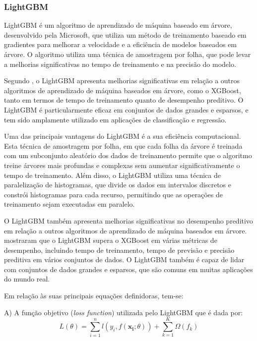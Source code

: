 \subsubsection{LightGBM}

LightGBM é um algoritmo de aprendizado de máquina baseado em árvore, desenvolvido pela Microsoft, que utiliza um método de treinamento baseado em gradientes para melhorar a velocidade e a eficiência de modelos baseados em árvore. O algoritmo utiliza uma técnica de amostragem por folha, que pode levar a melhorias significativas no tempo de treinamento e na precisão do modelo.

Segundo \cite{ke2017lightgbm}, o LightGBM apresenta melhorias significativas em relação a outros algoritmos de aprendizado de máquina baseados em árvore, como o XGBoost, tanto em termos de tempo de treinamento quanto de desempenho preditivo. O LightGBM é particularmente eficaz em conjuntos de dados grandes e esparsos, e tem sido amplamente utilizado em aplicações de classificação e regressão.

Uma das principais vantagens do LightGBM é a sua eficiência computacional. Esta técnica de amostragem por folha, em que cada folha da árvore é treinada com um subconjunto aleatório dos dados de treinamento permite que o algoritmo treine árvores mais profundas e complexas sem aumentar significativamente o tempo de treinamento. Além disso, o LightGBM utiliza uma técnica de paralelização de histogramas, que divide os dados em intervalos discretos e constrói histogramas para cada recurso, permitindo que as operações de treinamento sejam executadas em paralelo.

O LightGBM também apresenta melhorias significativas no desempenho preditivo em relação a outros algoritmos de aprendizado de máquina baseados em árvore. \cite{ke2017lightgbm} mostraram que o LightGBM supera o XGBoost em várias métricas de desempenho, incluindo tempo de treinamento, tempo de previsão e precisão preditiva em vários conjuntos de dados. O LightGBM também é capaz de lidar com conjuntos de dados grandes e esparsos, que são comuns em muitas aplicações do mundo real.

Em relação às suas principais equações definidoras, tem-se:

A) A função objetivo (\textit{loss function}) utilizada pelo LightGBM que é dada por:
\begin{equation}
    L(\theta) = \sum_{i=1}^n l(y_i, f(\mathbf{x_i};\theta)) + \sum_{k=1}^K \Omega(f_k)
\end{equation}

